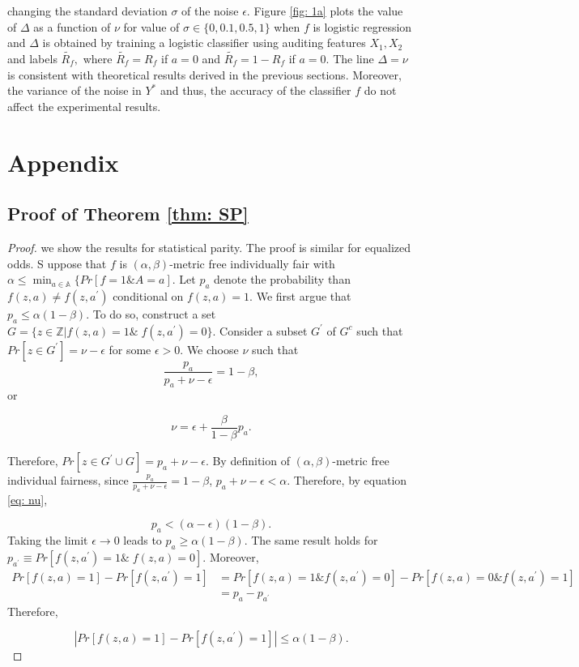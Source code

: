 \documentclass{article}
\begin{document}
changing the standard deviation $\sigma$ of the noise $\epsilon$. Figure \ref{fig: 1a} plots the value of $\Delta$ as a function of $\nu$ for value of $\sigma\in \{0, 0.1, 0.5, 1\}$ when $f$ is logistic regression and $\Delta$ is obtained by training a logistic classifier using auditing features $X_{1}, X_{2}$ and labels $\tilde{R_{f}},$ where  $\tilde{R_{f}}=R_{f}$ if $a=0$ and  $\tilde{R_{f}}=1 -R_{f}$ if $a=0$. The line $\Delta=\nu$ is consistent with theoretical results derived in the previous sections. Moreover, the variance of the noise in $Y^{*}$ and thus, the accuracy of the classifier $f$ do not affect the experimental results.

\section{Appendix}

\subsection{Proof of Theorem \ref{thm: SP}}
\begin{proof}
we show the results for statistical parity. The proof is similar for equalized odds. S
uppose that $f$ is $(\alpha,\beta)$-metric free individually fair with $\alpha \leq \min_{a\in \mathbb{A}}\{Pr[f=1 \& A=a]$. Let $p_{a}$ denote the probability than $f(z, a)\neq f(z, a^{'})$ conditional on  $f(z,a)=1$. We first argue that $p_{a} \leq \alpha(1-\beta)$. To do so, construct a set $G=\{z\in \mathbb{Z}| f(z,a)= 1 \& \; f(z,a^{'})=0\}$. Consider a subset $G^{'}$ of $G^{c}$ such that $Pr[z\in G^{'}]=\nu-\epsilon$ for some $\epsilon>0$. We choose $\nu$ such that $$\frac{p_{a}}{p_{a} + \nu -\epsilon} = 1-\beta, $$
or

\begin{equation}
\label{eq: nu}
\nu = \epsilon + \frac{\beta}{1-\beta}p_{a}.    
\end{equation}

Therefore, $Pr[z\in G^{'}\cup G]=p_{a} + \nu - \epsilon$. By definition of $(\alpha, \beta)$-metric free individual fairness, since $ \frac{p_{a}}{p_{a} + \nu -\epsilon} = 1-\beta$, $p_{a} + \nu -\epsilon < \alpha$. Therefore, by equation \eqref{eq: nu},

$$  p_{a} < (\alpha - \epsilon)(1-\beta).$$ Taking the limit $\epsilon \rightarrow 0$ leads to $p_{a}\geq \alpha(1-\beta)$. The same result holds for $p_{a^{'}}\equiv Pr[f(z, a^{'})=1 \& \; f(z,a)=0]$. Moreover,
\begin{equation}
    \begin{split}
        Pr[f(z, a)=1] - Pr[f(z, a^{'})=1] & =  Pr[f(z, a)=1 \& f(z, a^{'})=0] - Pr[f(z, a)=0 \& f(z, a^{'})=1] \\
         & = p_{a} - p_{a^{'}}
    \end{split}
\end{equation}
Therefore, 

$$|Pr[f(z, a)=1] - Pr[f(z, a^{'})=1]| \leq \alpha(1-\beta). $$
\end{proof}
\end{document}
